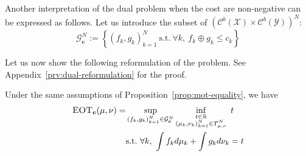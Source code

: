 Another interpretation of the dual problem when the cost are non-negative can be expressed as follows. Let us introduce the subset of $(\mathcal{C}^b(\mathcal{X})\times\mathcal{C}^b(\mathcal{Y}))^N$:
$$  
\mathcal{G}_{\mathbf{c}}^N := \left\{ (f_k,g_k)_{k=1}^N ~\mathrm{  s.t.  }~
     \forall k,~ f_k\oplus g_k\leq c_k\right\}
     $$

Let us now show the  following reformulation of the problem. See Appendix~\ref{prv:dual-reformulation} for the proof.
\begin{prop}
\label{prop:dual-reformulation}
Under the same assumptions of Proposition~\ref{prop:mot-equality},  we have
\begin{align}
\label{eq:dual_interp}
  \textsc{EOT}_{\mathbf{c}}(\mu,\nu) = & \sup\limits_{  (f_k,g_k)_{k=1}^N
 \in\mathcal{G}^N_{\mathbf{c}}}\inf_{\substack{t\in  \mathbb{R}\\(\mu_k,\nu_k)_{k=1}^N\in\Upsilon_{\mu,\nu}^N }}
 \hspace{0.3em}t\\
 &\nonumber\mathrm{ s.t.}~\forall k, ~ \int f_kd\mu_k+ \int g_kd\nu_k = t 
\end{align} 
\end{prop}


